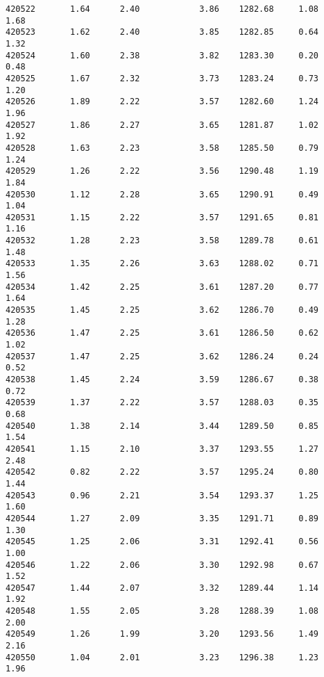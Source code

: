 \documentclass[11pt]{article}
\begin{document}
\begin{Verbatim}[commandchars=\\\{\}]
420522       1.64      2.40            3.86    1282.68     1.08        1.68   
420523       1.62      2.40            3.85    1282.85     0.64        1.32   
420524       1.60      2.38            3.82    1283.30     0.20        0.48   
420525       1.67      2.32            3.73    1283.24     0.73        1.20   
420526       1.89      2.22            3.57    1282.60     1.24        1.96   
420527       1.86      2.27            3.65    1281.87     1.02        1.92   
420528       1.63      2.23            3.58    1285.50     0.79        1.24   
420529       1.26      2.22            3.56    1290.48     1.19        1.84   
420530       1.12      2.28            3.65    1290.91     0.49        1.04   
420531       1.15      2.22            3.57    1291.65     0.81        1.16   
420532       1.28      2.23            3.58    1289.78     0.61        1.48   
420533       1.35      2.26            3.63    1288.02     0.71        1.56   
420534       1.42      2.25            3.61    1287.20     0.77        1.64   
420535       1.45      2.25            3.62    1286.70     0.49        1.28   
420536       1.47      2.25            3.61    1286.50     0.62        1.02   
420537       1.47      2.25            3.62    1286.24     0.24        0.52   
420538       1.45      2.24            3.59    1286.67     0.38        0.72   
420539       1.37      2.22            3.57    1288.03     0.35        0.68   
420540       1.38      2.14            3.44    1289.50     0.85        1.54   
420541       1.15      2.10            3.37    1293.55     1.27        2.48   
420542       0.82      2.22            3.57    1295.24     0.80        1.44   
420543       0.96      2.21            3.54    1293.37     1.25        1.60   
420544       1.27      2.09            3.35    1291.71     0.89        1.30   
420545       1.25      2.06            3.31    1292.41     0.56        1.00   
420546       1.22      2.06            3.30    1292.98     0.67        1.52   
420547       1.44      2.07            3.32    1289.44     1.14        1.92   
420548       1.55      2.05            3.28    1288.39     1.08        2.00   
420549       1.26      1.99            3.20    1293.56     1.49        2.16   
420550       1.04      2.01            3.23    1296.38     1.23        1.96   


\end{Verbatim}
\end{document}
